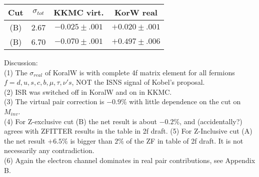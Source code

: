 \documentclass[dvips,portrait]{seminar}             %
\begin{document}
\begin{slide*}                                                %

{\small
\begin{tabular}{||c|c|c|c||}
\hline\hline
Cut  &  $\sigma_{tot}$ & KKMC virt.       & KorW real \\
\hline
(B)  &   2.67         & $-0.025\pm.001$  & $+0.020\pm.001$ \\
(B)  &   6.70         & $-0.070\pm.001$  & $+0.497\pm.006$ \\
\hline\hline
\end{tabular}}

{\small\color{blue}
Discussion:\\
(1) The $\sigma_{real}$ of KoralW is with complete 4f matrix element
    for all fermions $f=d,u,s,c,b,\mu,\tau,\nu's$, 
    NOT the ISNS signal of Kobel's proposal.\\
(2) ISR was switched off in KoralW and on in KKMC.\\
(3) The virtual pair correction is $-0.9\%$ 
    with little dependence on the cut on $M_{inv}$.\\
(4) For Z-exclusive cut (B) the net result is about $-0.2\%$, and
    (accidentally?) agrees with ZFITTER results in the table in 2f draft.
(5) For Z-Inclusive cut (A) the net result $+6.5\%$ is
    bigger than $2\%$ of the ZF in table of 2f draft. 
    It is not necessarily any contradiction.\\
(6) Again the electron channel dominates in real pair contributions, see Appendix B.\\
}
\vfill
\end{slide*}   %
\end{document}
